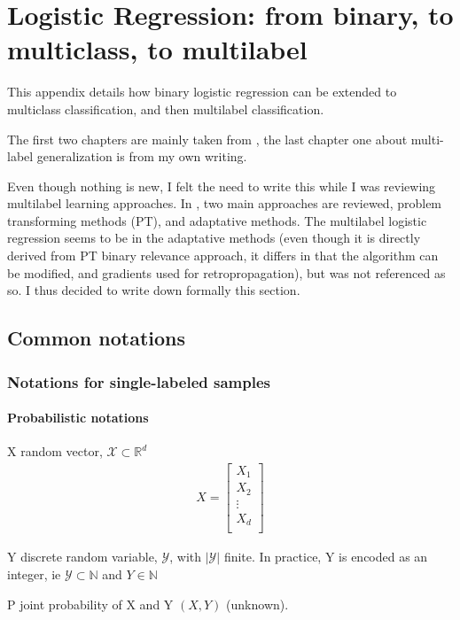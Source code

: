 \chapter{Logistic Regression: from binary, to multiclass, to multilabel} %
\label{cha:multilabel_classification}


This appendix details how binary logistic regression can be extended to multiclass classification, and then multilabel classification.

The first two chapters are mainly taken from \cite{stanfordLogistic}, the last chapter one about multi-label generalization is from my own writing.

Even though nothing is new, I felt the need to write this while I was reviewing multilabel learning approaches. In \cite{MultilabelReview}, two main approaches are reviewed, problem transforming methods (PT), and adaptative methods. The multilabel logistic regression seems to be in the adaptative methods (even though it is directly derived from PT binary relevance approach, it differs in that the algorithm can be modified, and gradients used for retropropagation), but was not referenced as so. I thus decided to write down formally this section.

\section*{Common notations}


\subsection*{Notations for single-labeled samples}

\subsubsection*{Probabilistic notations}

\begin{outline}
\1 X random vector, $\mathcal{X} \subset \mathbb{R}^d$
\begin{align}
	X = \left[
	\begin{array}{cccc}
		X_{1} \\
		X_{2} \\
		\vdots\\
		X_{d} \\
	\end{array}\right]
\end{align}

\1 Y discrete random variable, $\mathcal{Y} $, with $|\mathcal{Y}|$ finite. In practice, Y is encoded as an integer, ie $\mathcal{Y} \subset \mathbb{N} $ and $Y \in \mathbb{N}$

\1 P joint probability of X and Y $(X,Y)$ (unknown).
\end{outline}

